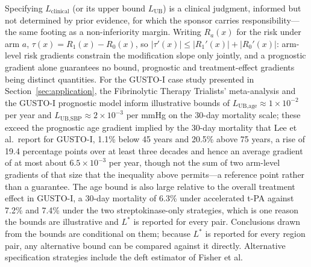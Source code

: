 \documentclass[AMA,Times1COL]{WileyNJDv5}
\begin{document}
Specifying $L_{\text{clinical}}$ (or its upper bound $L_{\text{UB}}$) is a clinical judgment, informed but not determined by prior evidence, for which the sponsor carries responsibility---the same footing as a non-inferiority margin. Writing $R_a(x)$ for the risk under arm $a$, $\tau(x) = R_1(x) - R_0(x)$, so $|\tau'(x)| \leq |R_1'(x)| + |R_0'(x)|$: arm-level risk gradients constrain the modification slope only jointly, and a prognostic gradient alone guarantees no bound, prognostic and treatment-effect gradients being distinct quantities.\cite{ballman2015,kent2020} For the GUSTO-I case study presented in Section~\ref{sec:application}, the Fibrinolytic Therapy Trialists' meta-analysis\cite{ftt1994} and the GUSTO-I prognostic model\cite{lee1995} inform illustrative bounds of $L_{\text{UB,age}} \approx 1 \times 10^{-2}$ per year and $L_{\text{UB,SBP}} \approx 2 \times 10^{-3}$ per mmHg on the 30-day mortality scale; these exceed the prognostic age gradient implied by the 30-day mortality that Lee et al.\ report for GUSTO-I, 1.1\% below 45 years and 20.5\% above 75 years,\cite{lee1995} a rise of 19.4 percentage points over at least three decades and hence an average gradient of at most about $6.5 \times 10^{-3}$ per year, though not the sum of two arm-level gradients of that size that the inequality above permits---a reference point rather than a guarantee. The age bound is also large relative to the overall treatment effect in GUSTO-I, a 30-day mortality of 6.3\% under accelerated t-PA against 7.2\% and 7.4\% under the two streptokinase-only strategies,\cite{gusto1993} which is one reason the bounds are illustrative and $L^*$ is reported for every pair. Conclusions drawn from the bounds are conditional on them; because $L^*$ is reported for every region pair, any alternative bound can be compared against it directly. Alternative specification strategies include the deft estimator of Fisher et al.\cite{fisher2017}
\end{document}
